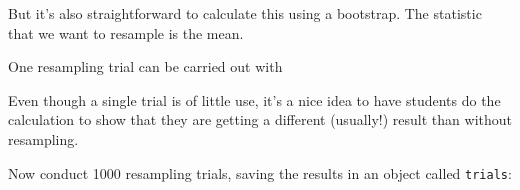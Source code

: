 But it's also straightforward to calculate this using a bootstrap.
The statistic that we want to resample is the mean.  
\begin{knitrout}
\end{knitrout}


One resampling trial can be carried out with
\begin{knitrout}
\end{knitrout}

Even though a single trial is of little use, it's a nice idea to have
students do the calculation to show that they are getting a different
(usually!) result than without resampling.

Now conduct 1000 resampling trials, saving the results in an object
called \texttt{trials}:
\begin{knitrout}
\end{knitrout}


